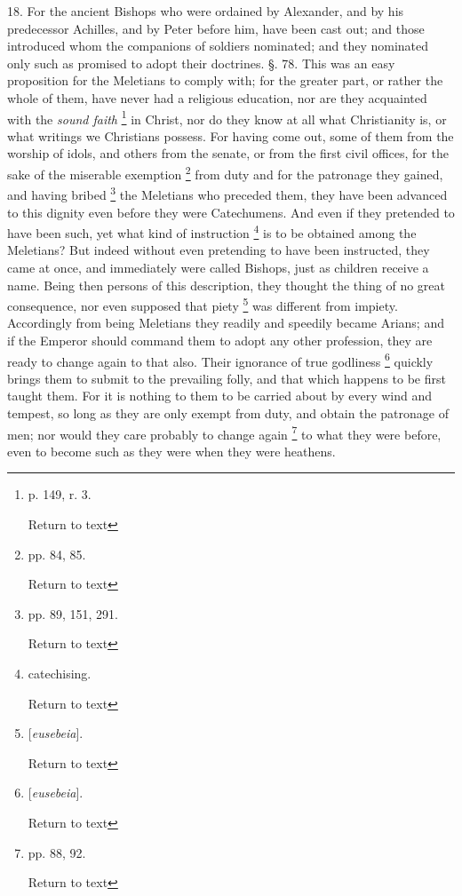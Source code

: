 18. For the ancient Bishops who were ordained by
Alexander, and by his predecessor Achilles, and by Peter before him,
have been cast out; and those introduced whom the companions of
soldiers nominated; and they nominated only such as promised to adopt
their doctrines. §. 78. This was an easy proposition for the
Meletians to comply with; for the greater part, or rather the whole of
them, have never had a religious education, nor are they acquainted
with the \emph{sound faith} \footnote{p. 149, r. 3.

Return to text} in Christ, nor do they know at
all what Christianity is, or what writings we Christians possess. For
having come out, some of them from the worship of idols, and others
from the senate, or from the first civil offices, for the sake of the
miserable exemption \footnote{pp. 84, 85.

Return to text} from duty and for the patronage they
gained, and having bribed \footnote{pp. 89, 151, 291.

Return to text} the Meletians who preceded them,
they have been advanced to this dignity even before they were
Catechumens. And even if they pretended to have been such, yet what
kind of instruction \footnote{catechising.

Return to text} is to be obtained among the Meletians?
But indeed without even pretending to have been instructed, they came
at once, and immediately were called Bishops, just as children receive
a name. Being then persons of this description, they thought the thing
of no great consequence, nor even supposed that piety \footnote{[\emph{eusebeia}].

Return to text}
was different from impiety. Accordingly from being Meletians they
readily and speedily became Arians; and if the Emperor should command
them to adopt any other profession, they are ready to change again to
that also. Their ignorance of true godliness \footnote{[\emph{eusebeia}].

Return to text} quickly brings
them to submit to the prevailing folly, and that which happens to be
first taught them. For it is nothing to them to be carried about by
every wind and tempest, so long as they are only exempt from duty, and
obtain the patronage of men; nor would they care probably to change
again \footnote{pp. 88, 92.

Return to text} to what they were before, even to become such as they
were when they were heathens.

